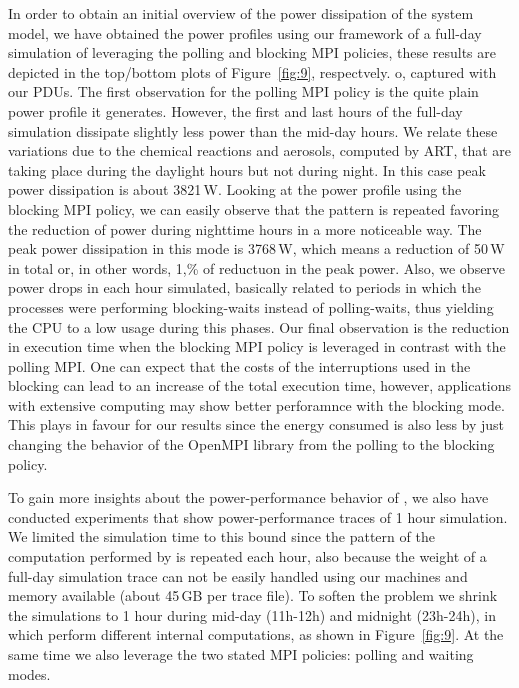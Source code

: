 In order to obtain an initial overview of the power dissipation of the system model, we have 
obtained the power profiles using our \pmlib framework of a full-day simulation of \cosmoart 
leveraging the polling and blocking MPI policies, these results are depicted in the top/bottom 
plots of Figure~\ref{fig:9}, respectvely. o, captured with our PDUs. The first observation for 
the polling MPI policy is the quite plain power profile it generates. However, the first and 
last hours of the full-day simulation dissipate slightly less power than the mid-day hours. We 
relate these variations due to the chemical reactions and aerosols, computed by ART, that are 
taking place during the daylight hours but not during night. In this case peak power 
dissipation is about 3821\,W. Looking at the power profile using the blocking MPI policy, we 
can easily observe that the pattern is repeated favoring the reduction of power during 
nighttime hours in a more  noticeable way. The peak power dissipation in this mode is 3768\,W, 
which means a reduction of 50\,W in total or, in other words, 1,\% of reductuon in the peak 
power. Also, we observe power  drops in each hour simulated, basically related to periods in 
which the processes were performing blocking-waits instead of polling-waits, thus yielding the 
CPU to a low usage during this phases. Our final observation is the reduction in execution time 
when the blocking MPI policy is leveraged in contrast with the polling MPI. One can expect that 
the costs of the interruptions used in the blocking can lead to an increase of the total 
execution time, however, applications with extensive computing may show better perforamnce with 
the blocking mode. This plays in favour for our results since the energy consumed is also less 
by just changing the behavior of the OpenMPI library from the polling to the blocking policy.

To gain more insights about the power-performance behavior of \cosmoart, we also have conducted 
experiments that show power-performance traces of 1 hour simulation. We limited the simulation 
time to this bound since the pattern of the computation performed by \cosmoart is repeated each 
hour, also because the weight of a full-day simulation trace can not be easily handled using 
our machines and memory available (about 45\,GB per trace file). To soften the problem we 
shrink the simulations to 1 hour during mid-day (11h-12h) and midnight (23h-24h), in which 
\cosmoart perform different internal computations, as shown in Figure~\ref{fig:9}. At the same
time we also leverage the two stated MPI policies: polling and waiting modes.



